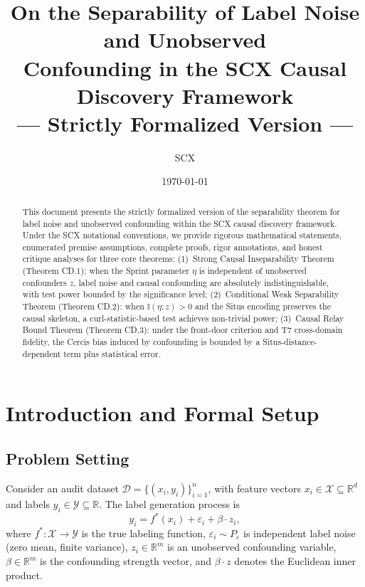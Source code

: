 \documentclass[12pt,a4paper]{article}
\title{\bfseries On the Separability of Label Noise and Unobserved\\
Confounding in the SCX Causal Discovery Framework\\
\large --- Strictly Formalized Version ---}
\author{SCX}
\date{\today}
\newcommand{\R}{\mathbb{R}}
\newcommand{\I}{\mathbb{I}}
\newcommand{\cX}{\mathcal{X}}
\newcommand{\cY}{\mathcal{Y}}
\newcommand{\cD}{\mathcal{D}}
\begin{document}
\maketitle

\begin{abstract}
This document presents the strictly formalized version of the separability theorem for label noise and unobserved confounding within the \textsf{SCX} causal discovery framework. Under the \textsf{SCX} notational conventions, we provide rigorous mathematical statements, enumerated premise assumptions, complete proofs, rigor annotations, and honest critique analyses for three core theorems:
(1)~Strong Causal Inseparability Theorem (Theorem CD.1): when the Sprint parameter $\eta$ is independent of unobserved confounders $z$, label noise and causal confounding are absolutely indistinguishable, with test power bounded by the significance level;
(2)~Conditional Weak Separability Theorem (Theorem CD.2): when $\I(\eta;z)>0$ and the Situs encoding preserves the causal skeleton, a curl-statistic-based test achieves non-trivial power;
(3)~Causal Relay Bound Theorem (Theorem CD.3): under the front-door criterion and T7 cross-domain fidelity, the Cercis bias induced by confounding is bounded by a Situs-distance-dependent term plus statistical error.
\end{abstract}

\section{Introduction and Formal Setup}
\label{sec:intro}

\subsection{Problem Setting}

Consider an audit dataset $\cD = \{(x_i, y_i)\}_{i=1}^n$, with feature vectors $x_i \in \cX \subseteq \R^d$ and labels $y_i \in \cY \subseteq \R$. The label generation process is
\begin{equation}\label{eq:label-process}
    y_i = f^*(x_i) + \varepsilon_i + \beta \cdot z_i,
\end{equation}
where $f^*: \cX \to \cY$ is the true labeling function, $\varepsilon_i \sim P_\varepsilon$ is independent label noise (zero mean, finite variance), $z_i \in \R^m$ is an unobserved confounding variable, $\beta \in \R^m$ is the confounding strength vector, and $\beta\cdot z$ denotes the Euclidean inner product.
\end{document}
